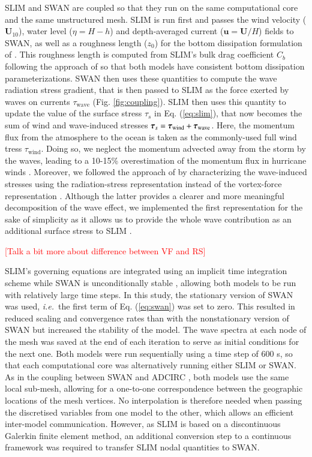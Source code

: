 \documentclass[preprint,12pt,authoryear]{elsarticle}
\newcommand{\ie}{{\it i.e.}\ }
\begin{document}
SLIM and SWAN are coupled so that they run on the same computational core and the same unstructured mesh. SLIM is run first and passes the wind velocity ($\mathbf{U}_{10}$), water level ($\eta=H-h$) and depth-averaged current ($\mathbf{u}=\mathbf{U}/H$) fields to SWAN, as well as a roughness length ($z_0$) for the bottom dissipation formulation of \cite{madsen1989spectral}. This roughness length is computed from SLIM's bulk drag coefficient $C_b$ following the approach of \cite{dietrich2011hurricane} so that both models have consistent bottom dissipation parameterizations. SWAN then uses these quantities to compute the wave radiation stress gradient, that is then passed to SLIM as the force exerted by waves on currents {\boldmath$\tau$}$_\text{wave}$ (Fig. \ref{fig:coupling}). SLIM then uses this quantity to update the value of the surface stress {\boldmath$\tau$}$_s$ in Eq. (\ref{eq:slim}), that now becomes the sum of wind and wave-induced stresses $\text{\boldmath$\tau$}_s = \text{\boldmath$\tau$}_\text{wind}+\text{\boldmath$\tau$}_\text{wave}$. Here, the momentum flux from the atmosphere to the ocean is taken as the commonly-used full wind tress {\boldmath$\tau$}$_\text{wind}$. Doing so, we neglect the momentum advected away from the storm by the waves, leading to a 10-15\% overestimation of the momentum flux in hurricane winds \citep{curcic2015explicit}. Moreover, we followed the approach of \cite{dietrich2012performance} by characterizing the wave-induced stresses using the radiation-stress representation instead of the vortex-force representation \citep{mcwilliams2004asymptotic}. Although the latter provides a clearer and more meaningful decomposition of the wave effect, we implemented the first representation for the sake of simplicity as it allows us to provide the whole wave contribution as an additional surface stress to SLIM \citep{lane2007wave}.

\textcolor{red}{[Talk a bit more about difference between VF and RS]}

SLIM's governing equations are integrated using an implicit time integration scheme while SWAN is unconditionally stable \citep{dietrich2012performance}, allowing both models to be run with relatively large time steps. In this study, the stationary version of SWAN was used, \ie the first term of Eq. (\ref{eq:swan}) was set to zero. This resulted in reduced scaling and convergence rates than with the nonstationary version of SWAN but increased the stability of the model. The wave spectra at each node of the mesh was saved at the end of each iteration to serve as initial conditions for the next one. Both models were run sequentially using a time step of 600 s, so that each computational core was alternatively running either SLIM or SWAN. As in the coupling between SWAN and ADCIRC \citep{dietrich2012performance}, both models use the same local sub-mesh, allowing for a one-to-one correspondence between the geographic locations of the mesh vertices. No interpolation is therefore needed when passing the discretised variables from one model to the other, which allows an efficient inter-model communication. However, as SLIM is based on  a discontinuous Galerkin finite element method, an additional conversion step to a continuous framework was required to transfer SLIM nodal quantities to SWAN.  
\end{document}

